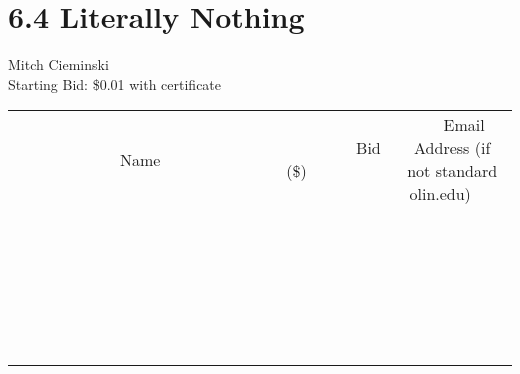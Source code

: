 \documentclass[11pt]{article}
\begin{document}
\section*{6.4 Literally Nothing}
Mitch Cieminski
\\
Starting Bid: \$0.01
\newline
with certificate
\\[6ex]
\begin{tabular}{c c c}
~~~~~~~~~~~~~Name~~~~~~~~~~~~~ & ~~~~~~~~~Bid (\$)~~~~~~~~~  & ~~~Email Address (if not standard olin.edu)~~~\\
 & & \\
\hline
 & & \\
\hline
 & & \\
\hline
 & & \\
\hline
 & & \\
\hline
 & & \\
\hline
 & & \\
\hline
 & & \\
\hline
 & & \\
\hline
 & & \\
\hline
 & & \\
\hline
 & & \\
\hline
 & & \\
\hline
 & & \\
\hline
 & & \\
\hline
 & & \\
\hline
 & & \\
\hline
 & & \\
\hline
 & & \\
\hline
 & & \\
\hline
 & & \\
\hline
 & & \\
\hline
 & & \\
\hline
 & & \\
\hline
 & & \\
\hline
 & & \\
\hline
\end{tabular}
\newpage
\end{document}
